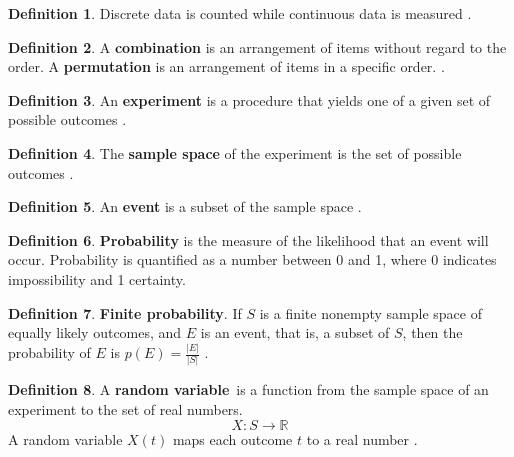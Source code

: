 \documentclass[12pt]{article}
\theoremstyle{plain}
\theoremstyle{definition}
\newtheorem{definition}{Definition}
\theoremstyle{remark}
\begin{document}
\begin{definition}
  Discrete data is counted while continuous data is measured
  \citep{matisfundis18}.
\end{definition}

\begin{definition}
  A \textbf{combination} is an arrangement of items without regard to the order.
  A \textbf{permutation} is an arrangement of items in a specific order.
  \citep{matisfuncom18}.
\end{definition}

\begin{definition}
  An \textbf{experiment} is a procedure that yields one of a given set of
  possible outcomes \citep{ros02}.
\end{definition}

\begin{definition}
  The \textbf{sample space} of the experiment is the set of possible outcomes
  \citep{ros02}.
\end{definition}

\begin{definition}
  An \textbf{event} is a subset of the sample space \citep{ros02}.
\end{definition}

\begin{definition}
  \textbf{Probability} is the measure of the likelihood that an event will
  occur.
  Probability is quantified as a number between 0 and 1, where 0 indicates
  impossibility and 1 certainty.
\end{definition}

\begin{definition}
  \textbf{Finite probability}. If $S$ is a finite nonempty sample space of
  equally likely outcomes, and $E$ is an event, that is, a subset of $S$,
  then the probability of $E$ is $p(E)=\frac{|E|}{|S|}$ \citep{ros02}.
\end{definition}

\begin{definition}
  A \textbf{random variable}\footnotemark\ is a function from the sample space
  of an experiment to the set of real numbers.
  \begin{equation*}
    X:S \to \mathbb{R}
  \end{equation*}
  A random variable $X(t)$ maps each outcome $t$ to a real number \citep{ros02}.
\end{definition}
\end{document}
